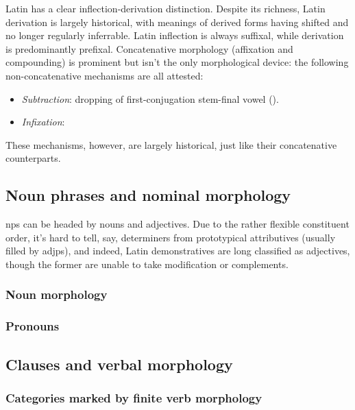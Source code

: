 \documentclass{article}
\begin{document}
Latin has a clear inflection-derivation distinction.
Despite its richness, 
Latin derivation is largely historical,
with meanings of derived forms 
having shifted and no longer regularly inferrable.
Latin inflection is always suffixal,
while derivation is predominantly prefixal.
Concatenative morphology (affixation and compounding) 
is prominent but isn't the only morphological device:
the following non-concatenative mechanisms are all attested:
\begin{itemize}
    \item \emph{Subtraction}: dropping of first-conjugation stem-final vowel ().
    \item \emph{Infixation}:  %
\end{itemize}
These mechanisms, however, are largely historical,
just like their concatenative counterparts.

\subsection{Noun phrases and nominal morphology}

\ac{np}s can be headed by nouns and adjectives.
Due to the rather flexible constituent order,
it's hard to tell, say, determiners from prototypical attributives (usually filled by \acs{adjp}s),
and indeed, Latin demonstratives are long classified as adjectives,
though the former are unable to take modification or complements.


\subsubsection{Noun morphology}\label{sec:nominal-inflection-abs}

\subsubsection{Pronouns}\label{sec:pro-abs}

\subsection{Clauses and verbal morphology}

\subsubsection{Categories marked by finite verb morphology}\label{sec:verb-inflection-abs}
\end{document}

